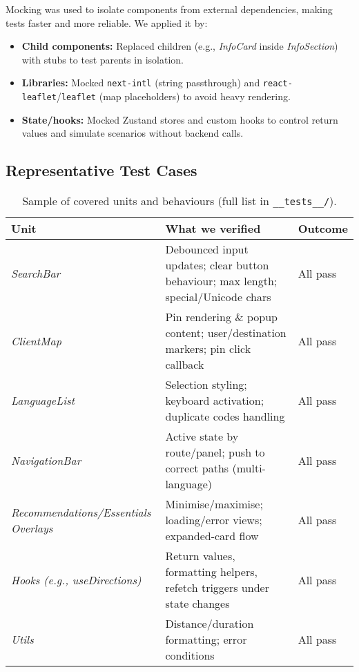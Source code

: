 Mocking was used to isolate components from external dependencies, making tests faster and more reliable. 
We applied it by:
\begin{itemize}
    \item \textbf{Child components:} Replaced children (e.g., \textit{InfoCard} inside \textit{InfoSection}) with stubs to test parents in isolation.  
    \item \textbf{Libraries:} Mocked \texttt{next-intl} (string passthrough) and \texttt{react-leaflet}/\texttt{leaflet} (map placeholders) to avoid heavy rendering.  
    \item \textbf{State/hooks:} Mocked Zustand stores and custom hooks to control return values and simulate scenarios without backend calls.  
\end{itemize}

\subsection{Representative Test Cases}
\begin{table}[h!]
\centering
\small
\begin{tabular}{p{3.2cm} p{6.7cm} p{3.2cm}}
\toprule
\textbf{Unit} & \textbf{What we verified} & \textbf{Outcome}\\
\midrule
\textit{SearchBar} & Debounced input updates; clear button behaviour; max length; special/Unicode chars & All pass \\
\textit{ClientMap} & Pin rendering \& popup content; user/destination markers; pin click callback & All pass \\
\textit{LanguageList} & Selection styling; keyboard activation; duplicate codes handling & All pass \\
\textit{NavigationBar} & Active state by route/panel; push to correct paths (multi-language) & All pass \\
\textit{Recommendations/Essen\-tials Overlays} & Minimise/maximise; loading/error views; expanded-card flow & All pass \\
\textit{Hooks (e.g., useDirections)} & Return values, formatting helpers, refetch triggers under state changes & All pass \\
\textit{Utils} & Distance/duration formatting; error conditions & All pass \\
\bottomrule
\end{tabular}
\caption{Sample of covered units and behaviours (full list in \texttt{\_\_tests\_\_/}).}
\label{tab:fe-unit-coverage}
\end{table}


